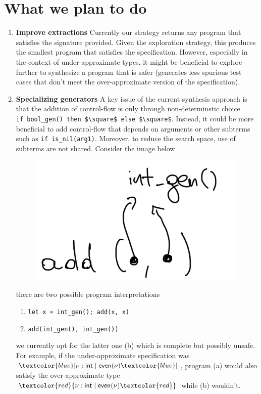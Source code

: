 \documentclass[review, sigplan]{acmart}
\begin{document}
\section*{What we plan to do}

\begin{enumerate}
    \item \textbf{Improve extractions} Currently our strategy returns any program that satisfies
    the signature provided.
    Given the exploration strategy, this produces the smallest
    program that satisfies the specification.
    However, especially in the context of under-approximate
    types, it might be beneficial to explore further to
    synthesize a program that is safer (generates less spurious
    test cases that don't meet the over-approximate version of
    the specification).
    \item \textbf{Specializing generators}
    A key issue of the current synthesis approach is that
    the addition of control-flow is only through
    non-determinstic choice \\ \lstinline{if bool_gen() then $\square$ else $\square$}.
    Instead, it could be more beneficial to add control-flow
    that depends on arguments or other subterms such as
    \texttt{if is\_nil(arg1)}.
    Moreover, to reduce the search space, use of subterms
    are not shared. Consider the image below

    \begin{figure}[h!]
    \includegraphics[width=.2\textwidth]{img.png}
    \end{figure}

    there are two possible program interpretations
    \begin{enumerate}
        \item \texttt{let x = int\_gen(); add(x, x)}
        \item \texttt{add(int\_gen(), int\_gen())}
    \end{enumerate}
    we currently opt for the latter one (b) which is
    complete but possibly unsafe.
    For example, if the under-approximate specification was
    ${\textcolor{blue}[}\nu : \textsf{int} \mid \textsf{even}(\nu){\textcolor{blue}]}$,
    program (a) would also satisfy the over-approximate type
    ${\textcolor{red}\{}\nu : \textsf{int} \mid \textsf{even}(\nu){\textcolor{red}\}}$
    while (b) wouldn't.
\end{enumerate}
\end{document}
